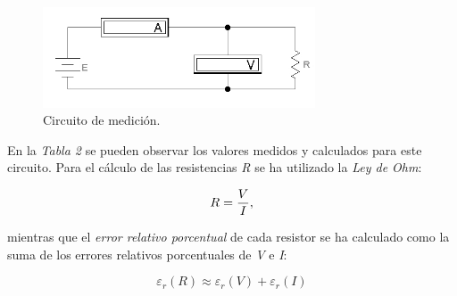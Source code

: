 \documentclass{article}
\begin{document}
\begin{figure}[h]
	\centering
	\includegraphics[width=0.72\textwidth]{images/p2-item-a.jpg}
	\caption{Circuito de medición.}
\end{figure}
\bigskip\bigskip


\noindent En la \textit{Tabla 2} se pueden observar los valores medidos y calculados para este circuito. Para el cálculo de las resistencias \textit{R} se ha utilizado la \textit{Ley de Ohm}:
\medskip

\begin{equation}
 	R = {V \over I},
\end{equation}
\medskip

\noindent mientras que el \textit{error relativo porcentual} de cada resistor se ha calculado como la suma de los errores relativos porcentuales de \textit{V} e \textit{I}:
\medskip

\begin{equation}
 	\varepsilon_r(R) \approx \varepsilon_r(V) + \varepsilon_r(I)
\end{equation}
\bigskip
\end{document}
